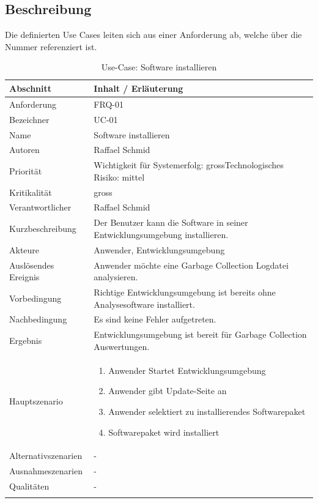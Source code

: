 \subsection{Beschreibung}
Die definierten Use Cases leiten sich aus einer Anforderung ab, welche über die Nummer referenziert ist.
\begin{longtable}{|p{4cm}|p{10.5cm}|}
  \hline
   \textbf{Abschnitt} & \textbf{Inhalt / Erläuterung} \\\hline
   Anforderung & FRQ-01\\\hline
   Bezeichner & UC-01\\\hline
   Name & Software installieren\\\hline
   Autoren & Raffael Schmid\\\hline
   Priorität & Wichtigkeit für Systemerfolg: gross\newline Technologisches Risiko: mittel\\\hline
   Kritikalität & gross\\\hline
   Verantwortlicher & Raffael Schmid\\\hline
   Kurzbeschreibung & Der Benutzer kann die Software in seiner Entwicklungsumgebung installieren.\\\hline
   Akteure & Anwender, Entwicklungsumgebung\\\hline
   Auslösendes Ereignis & Anwender möchte eine Garbage Collection Logdatei analysieren.\\\hline
   Vorbedingung & Richtige Entwicklungsumgebung ist bereits ohne Analysesoftware installiert.\\\hline
   Nachbedingung & Es sind keine Fehler aufgetreten.\\\hline
   Ergebnis & Entwicklungsumgebung ist bereit für Garbage Collection Auswertungen.\\\hline
   Hauptszenario & 
         \begin{enumerate}
		\item Anwender Startet Entwicklungsumgebung
		\item Anwender gibt Update-Seite an
		\item Anwender selektiert zu installierendes Softwarepaket
		\item Softwarepaket wird installiert	
 	\end{enumerate}
	\\\hline
   Alternativszenarien & -\\\hline
   Ausnahmeszenarien & -\\\hline
   Qualitäten & -\\\hline
\caption{Use-Case: Software installieren}
\end{longtable}

